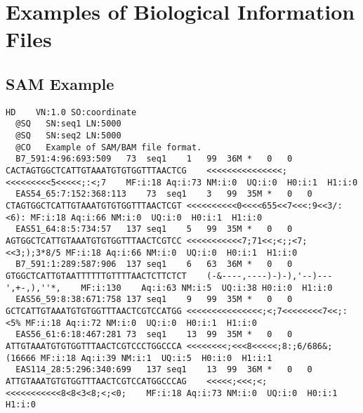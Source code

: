 \chapter{Examples of Biological Information Files}\label{annex:formats}

\section{SAM Example}
\begin{lstlisting}[numbers=none, breaklines=true]
  HD	VN:1.0 SO:coordinate
  @SQ	SN:seq1	LN:5000
  @SQ	SN:seq2	LN:5000
  @CO	Example of SAM/BAM file format.
  B7_591:4:96:693:509	73	seq1	1	99	36M	*	0	0	CACTAGTGGCTCATTGTAAATGTGTGGTTTAACTCG	<<<<<<<<<<<<<<<;<<<<<<<<<5<<<<<;:<;7	MF:i:18	Aq:i:73	NM:i:0	UQ:i:0	H0:i:1	H1:i:0
  EAS54_65:7:152:368:113	73	seq1	3	99	35M	*	0	0	CTAGTGGCTCATTGTAAATGTGTGGTTTAACTCGT	<<<<<<<<<<0<<<<655<<7<<<:9<<3/:<6):	MF:i:18	Aq:i:66	NM:i:0	UQ:i:0	H0:i:1	H1:i:0
  EAS51_64:8:5:734:57	137	seq1	5	99	35M	*	0	0	AGTGGCTCATTGTAAATGTGTGGTTTAACTCGTCC	<<<<<<<<<<<7;71<<;<;;<7;<<3;);3*8/5	MF:i:18	Aq:i:66	NM:i:0	UQ:i:0	H0:i:1	H1:i:0
  B7_591:1:289:587:906	137	seq1	6	63	36M	*	0	0	GTGGCTCATTGTAATTTTTTGTTTTAACTCTTCTCT	(-&----,----)-)-),'--)---',+-,),''*,	MF:i:130	Aq:i:63	NM:i:5	UQ:i:38	H0:i:0	H1:i:0
  EAS56_59:8:38:671:758	137	seq1	9	99	35M	*	0	0	GCTCATTGTAAATGTGTGGTTTAACTCGTCCATGG	<<<<<<<<<<<<<<<;<;7<<<<<<<<7<<;:<5%	MF:i:18	Aq:i:72	NM:i:0	UQ:i:0	H0:i:1	H1:i:0
  EAS56_61:6:18:467:281	73	seq1	13	99	35M	*	0	0	ATTGTAAATGTGTGGTTTAACTCGTCCCTGGCCCA	<<<<<<<<;<<<8<<<<<;8:;6/686&;(16666	MF:i:18	Aq:i:39	NM:i:1	UQ:i:5	H0:i:0	H1:i:1
  EAS114_28:5:296:340:699	137	seq1	13	99	36M	*	0	0	ATTGTAAATGTGTGGTTTAACTCGTCCATGGCCCAG	<<<<<;<<<;<;<<<<<<<<<<<8<8<3<8;<;<0;	MF:i:18	Aq:i:73	NM:i:0	UQ:i:0	H0:i:1	H1:i:0
\end{lstlisting}

